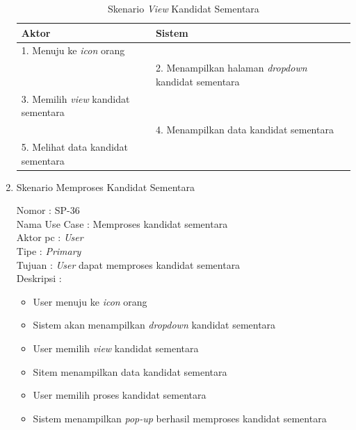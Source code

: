 \begin{enumerate}
\begin{itemize}
	
\end{itemize}

\begin{table}
	\caption{Skenario \textit{View} Kandidat Sementara}
	\centering
	\begin{tabular}{ | l | p{66mm}|}
		\hline 
		\textbf{Aktor} & \textbf{Sistem} \\
		\hline
		
		1.	Menuju ke \textit{icon} orang&  \\
		
		\hline
		
		&  2.	Menampilkan halaman  \textit{dropdown} kandidat sementara \\
		
		\hline
		
		3. Memilih \textit{view} kandidat sementara & \\
		
		\hline
		
		& 4. Menampilkan data kandidat sementara \\
		\hline
		
		5. Melihat data kandidat sementara & \\
		\hline
		
		
	\end{tabular}
\end{table}

\item Skenario Memproses Kandidat Sementara

Nomor \kern 3.6pc : SP-36 \\
Nama Use Case : Memproses kandidat sementara \\
Aktor  pc : \textit{User} \\
Tipe \kern 4.6pc : \textit{Primary} \\
Tujuan \kern 3.6pc : \textit{User} dapat memproses kandidat sementara \\
Deskripsi \kern 2.5pc : 

\begin{itemize}
	\item User menuju ke \textit{icon} orang
	\item Sistem akan menampilkan \textit{dropdown} kandidat sementara
	\item User memilih \textit{view} kandidat sementara
	\item Sitem menampilkan data kandidat sementara
	\item User memilih proses kandidat sementara
	\item Sistem menampilkan \textit{pop-up} berhasil memproses kandidat sementara
	

\end{itemize}
\end{enumerate}
